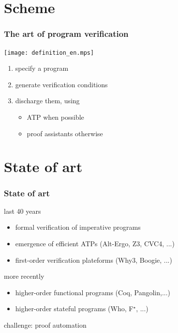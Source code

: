 \documentclass[xcolor=dvipsnames]{beamer}
\begin{document}
\section*{Scheme}
\begin{frame}
\frametitle{The art of program verification}
\texttt{[image: definition\_en.mps]}
\bigskip\pause
  \begin{enumerate}
  \item {\red specify} a program \pause
  \item {\red generate} verification conditions \pause
  \item {\red discharge} them, using
    \begin{itemize}
    \item ATP when possible
    \item proof assistants otherwise
    \end{itemize}
  \end{enumerate}
\end{frame}

\section*{State of art}
\begin{frame}
\frametitle{State of art}
{\red last 40 years}
	\begin{itemize}
		\item[] formal verification of imperative programs 
		\item[] emergence of efficient ATPs (Alt-Ergo, Z3, CVC4, ...)
		\item[] first-order verification plateforms (Why3, Boogie, ...)
	\end{itemize}\vspace*{1em} \pause
{\red more recently}
	\begin{itemize}
		\item[] higher-order functional programs (Coq, Pangolin,...)
		\item[] higher-order {\red stateful} programs (Who, F$^\star$, ...)
	\end{itemize}
\pause
\bigskip
{\red challenge}: proof automation
\end{frame}
\end{document}
